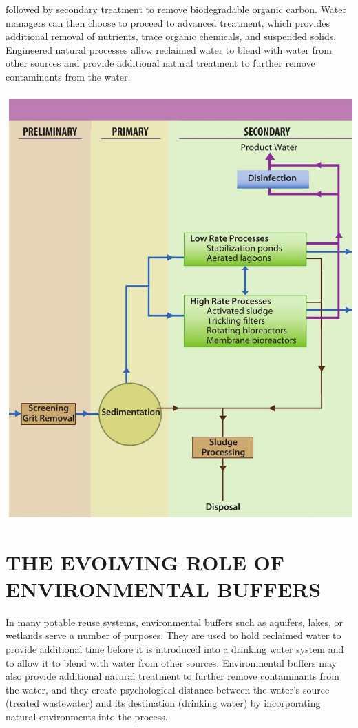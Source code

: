 \documentclass[10pt]{article}
\begin{document}
followed by secondary treatment to remove biodegradable organic carbon. Water managers can then choose to proceed to advanced treatment, which provides additional removal of nutrients, trace organic chemicals, and suspended solids. Engineered natural processes allow reclaimed water to blend with water from other sources and provide additional natural treatment to further remove contaminants from the water.

\includegraphics[max width=\textwidth]{2022_11_05_93277ca2de7ec5580550g-07}

\section{THE EVOLVING ROLE OF ENVIRONMENTAL BUFFERS}
In many potable reuse systems, environmental buffers such as aquifers, lakes, or wetlands serve a number of purposes. They are used to hold reclaimed water to provide additional time before it is introduced into a drinking water system and to allow it to blend with water from other sources. Environmental buffers may also provide additional natural treatment to further remove contaminants from the water, and they create psychological distance between the water's source (treated wastewater) and its destination (drinking water) by incorporating natural environments into the process.
\end{document}
